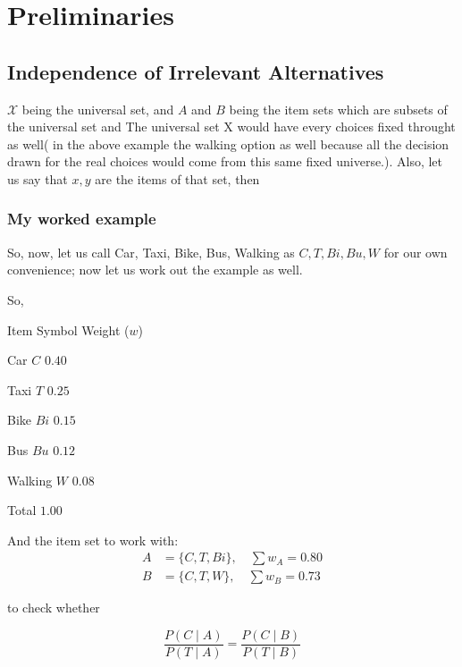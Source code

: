 \chapter{Preliminaries}

\section{Independence of Irrelevant Alternatives}

$\mathcal{X}$ being the universal set, and $A$ and $B$ being the item
sets which are subsets of the universal set and The universal set X would have every choices fixed throught as well( in the above example the walking option as well because all the decision drawn for the real choices would come from this same fixed universe.). Also, let us say that $x, y$ are the
items of that set, then 



\subsection*{My worked example}



So, now, let us call Car, Taxi, Bike, Bus, Walking as
$C, T, Bi, Bu, W$ for our own convenience; now let us work out
the example as well.

So,

Item \quad Symbol \quad Weight ($w$)

Car \quad\quad $C$ \quad\quad $0.40$

Taxi \quad\quad $T$ \quad\quad $0.25$

Bike \quad\quad $Bi$ \quad\quad $0.15$

Bus \quad\quad $Bu$ \quad\quad $0.12$

Walking \quad $W$ \quad\quad $0.08$

\hspace{1.6cm} Total \quad $1.00$

And the item set to work with:
\begin{align*}
    A &= \{C, T, Bi\}, \quad \sum w_A = 0.80 \\
    B &= \{C, T, W\}, \quad \sum w_B = 0.73
\end{align*}

to check whether

\begin{equation*}
    \frac{P(C \mid A)}{P(T \mid A)} = \frac{P(C \mid B)}{P(T \mid B)}
\end{equation*}

